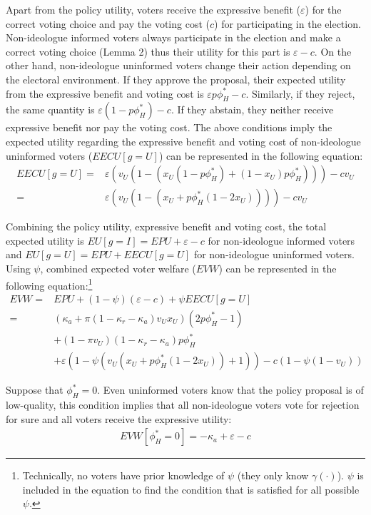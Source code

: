 \par Apart from the policy utility, voters receive the expressive benefit ($\varepsilon$) for the correct voting choice and pay the voting cost ($c$) for participating in the election. Non-ideologue informed voters always participate in the election and make a correct voting choice (Lemma 2) thus their utility for this part is $\varepsilon - c$. On the other hand, non-ideologue uninformed voters change their action depending on the electoral environment. If they approve the proposal, their expected utility from the expressive benefit and voting cost is $\varepsilon p \phi^*_H   - c $. Similarly, if they reject, the same quantity is $\varepsilon (1- p \phi^*_H)   - c$. If they abstain, they neither receive expressive benefit nor pay the voting cost. The above conditions imply the expected utility regarding the expressive benefit and voting cost of non-ideologue uninformed voters ($EECU[g=U]$) can be represented in the following equation:   
\begin{align*}
EECU[g=U] =& \varepsilon (v_U (1 - ( x_U(1-p \phi^*_H)  + (1-x_U)p\phi^*_H ) ) )- c v_U \\
=& \varepsilon (v_U (1 - ( x_U + p\phi^*_H ( 1 - 2 x_U ) ) ) )- c v_U 
\end{align*}

\par Combining the policy utility, expressive benefit and voting cost, the total expected utility is $EU[g=I] = EPU + \varepsilon - c$ for non-ideologue informed voters and $EU[g=U] = EPU + EECU[g=U]$ for non-ideologue uninformed voters. Using $\psi$, combined expected voter welfare ($EVW$) can be represented in the following equation:\footnote{Technically, no voters have prior knowledge of $\psi$ (they only know $\gamma(\cdot)$). $\psi$ is included in the equation to find the condition that is satisfied for all possible $\psi$.}
\begin{align*}
EVW =&  EPU + (1-\psi)(\varepsilon - c) + \psi EECU[g=U] \\
=& ( \kappa_{a} + \pi (1-\kappa_{r}-\kappa_{a})v_U x_U)(2 p \phi^*_H - 1) \\
&+ (1-\pi v_U) (1-\kappa_{r}-\kappa_{a}) p \phi^*_H \\
&+ \varepsilon ( 1 - \psi( v_U ( x_U + p\phi^*_H ( 1 - 2 x_U )) + 1 ) ) - c ( 1 - \psi(1-v_U) )  
\end{align*}

\par Suppose that $\phi^*_H=0$. Even uninformed voters know that the policy proposal is of low-quality, this condition implies that all non-ideologue voters vote for rejection for sure and all voters receive the expressive utility:
\begin{align*}
EVW[\phi^*_H=0] = - \kappa_a + \varepsilon - c
\end{align*}


